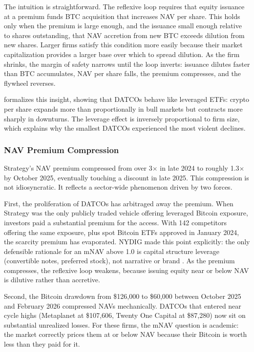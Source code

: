 The intuition is straightforward. The reflexive loop requires that equity issuance at a premium funds BTC acquisition that increases NAV per share. This holds only when the premium is large enough, and the issuance small enough relative to shares outstanding, that NAV accretion from new BTC exceeds dilution from new shares. Larger firms satisfy this condition more easily because their market capitalization provides a larger base over which to spread dilution. As the firm shrinks, the margin of safety narrows until the loop inverts: issuance dilutes faster than BTC accumulates, NAV per share falls, the premium compresses, and the flywheel reverses.

\citet{papadogiannis2025crypto} formalizes this insight, showing that DATCOs behave like leveraged ETFs: crypto per share expands more than proportionally in bull markets but contracts more sharply in downturns. The leverage effect is inversely proportional to firm size, which explains why the smallest DATCOs experienced the most violent declines.

\subsubsection{NAV Premium Compression}

Strategy's NAV premium compressed from over 3$\times$ in late 2024 to roughly 1.3$\times$ by October 2025, eventually touching a discount in late 2025. This compression is not idiosyncratic. It reflects a sector-wide phenomenon driven by two forces.

First, the proliferation of DATCOs has arbitraged away the premium. When Strategy was the only publicly traded vehicle offering leveraged Bitcoin exposure, investors paid a substantial premium for the access. With 142 competitors offering the same exposure, plus spot Bitcoin ETFs approved in January 2024, the scarcity premium has evaporated. NYDIG made this point explicitly: the only defensible rationale for an mNAV above 1.0 is capital structure leverage (convertible notes, preferred stock), not narrative or brand \citep{nydig2025premiums}. As the premium compresses, the reflexive loop weakens, because issuing equity near or below NAV is dilutive rather than accretive.

Second, the Bitcoin drawdown from \$126,000 to \$60,000 between October 2025 and February 2026 compressed NAVs mechanically. DATCOs that entered near cycle highs (Metaplanet at \$107,606, Twenty One Capital at \$87,280) now sit on substantial unrealized losses. For these firms, the mNAV question is academic: the market correctly prices them at or below NAV because their Bitcoin is worth less than they paid for it.

